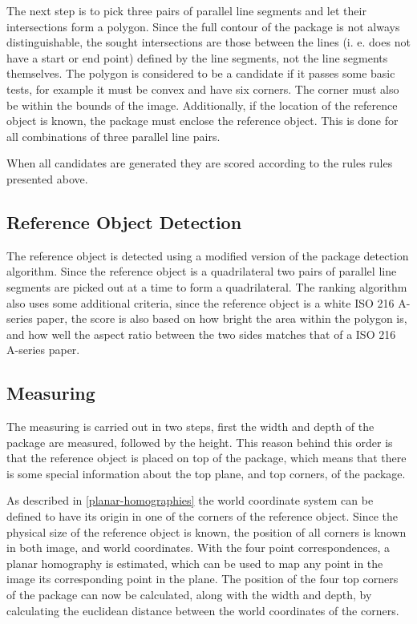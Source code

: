 The next step is to pick three pairs of parallel line segments and let their intersections form a polygon. 
Since the full contour of the package is not always distinguishable, the sought intersections are those between the lines (i. e. does not have a start or end point) defined by the line segments, not the line segments themselves. %
The polygon is considered to be a candidate if it passes some basic tests, for example it must be convex and have six corners. 
The corner must also be within the bounds of the image.
Additionally, if the location of the reference object is known, the package must enclose the reference object.
This is done for all combinations of three parallel line pairs.

When all candidates are generated they are scored according to the rules rules presented above.

\subsection{Reference Object Detection}

The reference object is detected using a modified version of the package detection algorithm.
Since the reference object is a quadrilateral two pairs of parallel line segments are picked out at a time to form a quadrilateral.
The ranking algorithm also uses some additional criteria, since the reference object is a white ISO 216 A-series  paper, the score is also based on how bright the area within the polygon is, and how well the aspect ratio between the two sides matches that of a ISO 216 A-series paper.

\subsection{Measuring}

The measuring is carried out in two steps, first the width and depth of the package are measured, followed by the height. 
This reason behind this order is that the reference object is placed on top of the package, which means that there is some special information about the top plane, and top corners, of the package.

As described in \ref{planar-homographies} the world coordinate system can be defined to have its origin in one of the corners of the reference object.
Since the physical size of the reference object is known, the position of all corners is known in both image, and world coordinates.
With the four point correspondences, a planar homography is estimated, which can be used to map any point in the image its corresponding point in the plane.
The position of the four top corners of the package can now be calculated, along with the width and depth, by calculating the euclidean distance between the world coordinates of the corners.

